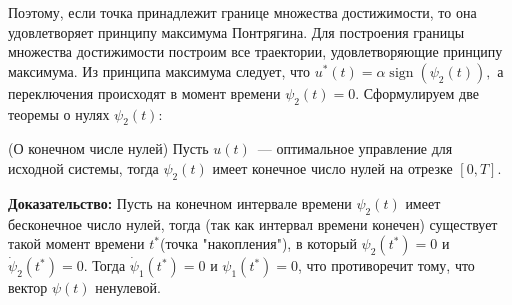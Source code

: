 \documentclass{article}
\theoremstyle{definition}
\DeclareMathOperator{\sign}{sign}
\begin{document}
 	{Поэтому, если точка принадлежит границе множества достижимости, то она удовлетворяет принципу максимума Понтрягина. Для построения границы множества достижимости построим все траектории, удовлетворяющие принципу максимума. }
 	\newpage
 	{Из принципа максимума следует, что $u^*(t) = \alpha\sign(\psi_2(t)),$ а переключения происходят в момент времени $\psi_2(t) = 0.$}
 	\newline
 	{Сформулируем две теоремы о нулях $\psi_2(t):$}
 	\begin{theorem}
 		{(О конечном числе нулей) Пусть $u(t)$~--- оптимальное управление для исходной системы, тогда $\psi_2(t)$ имеет конечное число нулей на отрезке $[0, T].$}
 		
    \end{theorem}	
 		{\textbf{Доказательство:} Пусть на  конечном интервале времени $\psi_2(t)$ имеет бесконечное число нулей, тогда (так как интервал времени конечен) существует такой момент времени $t^*$(точка "накопления"), в который $\psi_2(t^*) = 0$ и $\dot \psi_2(t^*) = 0.$ Тогда $\dot \psi_1(t^*) = 0$ и $\psi_1(t^*) = 0$, что противоречит тому, что вектор $\psi(t)$ ненулевой.} 
 	
\end{document}

